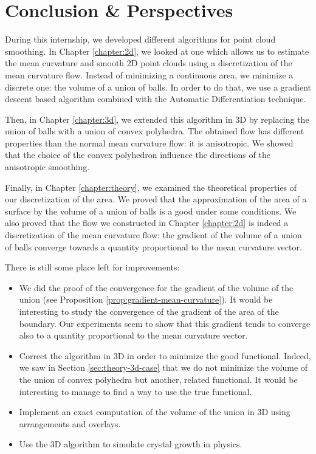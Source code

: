 \chapter{Conclusion \& Perspectives}


During this internship, we developed different algorithms for point cloud
smoothing. In Chapter \ref{chapter:2d}, we looked at one which allows us to
estimate the mean curvature and smooth 2D point clouds using a discretization of
the mean curvature flow. Instead of minimizing a continuous area, we minimize a
discrete one: the volume of a union of balls. In order to do that, we use a
gradient descent based algorithm combined with the Automatic Differentiation
technique.

Then, in Chapter \ref{chapter:3d}, we extended this algorithm in 3D by replacing
the union of balls with a union of convex polyhedra. The obtained flow has
different properties than the normal mean curvature flow: it is anisotropic. We
showed that the choice of the convex polyhedron influence the directions of the
anisotropic smoothing.

Finally, in Chapter \ref{chapter:theory}, we examined the theoretical properties
of our discretization of the area. We proved that the approximation of the area
of a surface by the volume of a union of balls is a good under some conditions.
We also proved that the flow we constructed in Chapter \ref{chapter:2d} is
indeed a discretization of the mean curvature flow: the gradient of the volume
of a union of balls converge towards a quantity proportional to the mean
curvature vector.

There is still some place left for improvements:
\begin{itemize}
    \item We did the proof of the convergence for the gradient of the volume of
        the union (see Proposition \ref{prop:gradient-mean-curvature}). It would
        be interesting to study the convergence of the gradient of the area of
        the boundary. Our experiments seem to show that this gradient tends to
        converge also to a quantity proportional to the mean curvature vector.
    \item Correct the algorithm in 3D in order to minimize the good functional.
        Indeed, we saw in Section \ref{sec:theory-3d-case} that we do not
        minimize the volume of the union of convex polyhedra but another,
        related functional. It would be interesting to manage to find a way to
        use the true functional.
    \item Implement an exact computation of the volume of the union in 3D using
        arrangements and overlays.
    \item Use the 3D algorithm to simulate crystal growth in physics.
\end{itemize}

